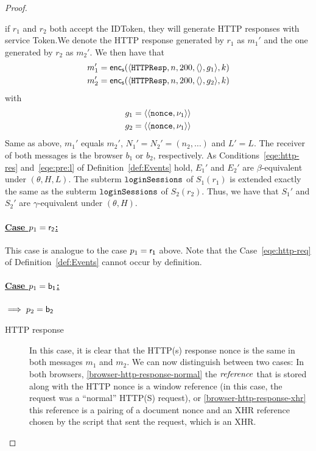\begin{proof}
\begin{itemize}
        if $r_1$ and $r_2$ both accept the IDToken, they will 
        generate HTTP responses with service Token.We denote 
        the HTTP response generated by $r_1$ as $m_1'$ and the
        one generated by $r_2$ as $m_2'$. We then have that
        \begin{align*}
          m_1' = \mathsf{enc}_\mathsf{s}(\langle\mathtt{HTTPResp},n,200,\langle\rangle,g_1\rangle,k) \\
          m_2' = \mathsf{enc}_\mathsf{s}(\langle\mathtt{HTTPResp},n,200,\langle\rangle,g_2\rangle,k)
        \end{align*}
        with
        \begin{align*}
          g_1 = \langle\langle\mathtt{nonce}, \nu_1\rangle\rangle \\
          g_2 = \langle\langle\mathtt{nonce}, \nu_1\rangle\rangle
        \end{align*}
        Same as above, $m_1'$ equals $m_2'$, $N_1' = N_2' = 
        (n_2, \dots)$ and $L' = L$. 
        The receiver of both messages is the browser $b_1$ or 
        $b_2$, respectively. As Conditions~\ref{eqe:http-res} 
        and~\ref{eqe:pre:l} of Definition~\ref{def:Events} hold, 
        $E_1'$ and $E_2'$ are $\beta$-equivalent under 
        $(\theta,H,L)$. The subterm $\mathtt{loginSessions}$ of 
        $S_1(r_1)$ is extended exactly the same as the subterm 
        $\mathtt{loginSessions}$ of $S_2(r_2)$. Thus, we have that 
        $S_1'$ and $S_2'$ are $\gamma$-equivalent under 
        $(\theta,H)$.
    \end{itemize}
  
    \paragraph{\underline{Case $p_1 = \mathsf{r_2}$:}} This case is
    analogue to the case $p_1 = \mathsf{r_1}$ above. Note that the
    Case~\ref{eqe:http-req} of Definition~\ref{def:Events} 
    cannot occur by definition.
  
    \paragraph{\underline{Case $p_1 = \mathsf{b_1}$:}} 
    $\implies p_2 = \mathsf{b_2}$ 
  
  
    \begin{description}
      \item[HTTP response]\label{proof:http-response} In this case, it is clear that
        the HTTP(s) response nonce is the same in both
        messages $m_1$ and $m_2$. 
        We can now distinguish between two cases: 
        In both browsers, \ref{browser-http-response-normal}
        the $\mathit{reference}$ that is stored along with the HTTP 
        nonce is a window reference (in this case, the request 
        was a ``normal'' HTTP(S) request), 
        or \ref{browser-http-response-xhr} this reference is a 
        pairing of a document nonce and an XHR reference chosen 
        by the script that sent the request, which is an XHR.
        

\end{description}
\end{proof}
